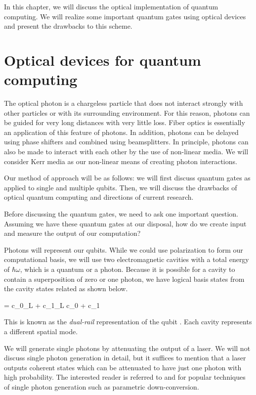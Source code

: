 In this chapter, we will discuss the optical implementation of quantum computing. We will realize some important quantum gates using optical devices and present the drawbacks to this scheme.
\section{Optical devices for quantum computing}
The optical photon is a chargeless particle that does not interact strongly with other particles or with its surrounding environment. For this reason, photons can be guided for very long distances with very little loss. Fiber optics is essentially an application of this feature of photons. In addition, photons can be delayed using phase shifters and combined using beamsplitters. In principle, photons can also be made to interact with each other by the use of non-linear media. We will consider Kerr media as our non-linear means of creating photon interactions. 

Our method of approach will be as follows: we will first discuss quantum gates as applied to single and multiple qubits. Then, we will discuss the drawbacks of optical quantum computing and directions of current research.

Before discussing the quantum gates, we need to ask one important question. Assuming we have these quantum gates at our disposal, how do we create input and measure the output of our computation? 

Photons will represent our qubits. While we could use polarization to form our computational basis, we will use two electromagnetic cavities with a total energy of $\hbar\omega$, which is a quantum or a photon. Because it is possible for a cavity to contain a superposition of zero or one photon, we have logical basis states from the cavity states related as shown below.

\beq
\ketp = c_0_L + c_1_L \equiv c_0 + c_1
\eeq

This is known as the \textit{dual-rail} representation of the qubit \cite{nielsen2000}. Each cavity represents a different spatial mode.

We will generate single photons by attenuating the output of a laser. We will not discuss single photon generation in detail, but it suffices to mention that a laser outputs coherent states which can be attenuated to have just one photon with high probability. The interested reader is referred to \cite{foxqoptics} and \cite{milburnqoptics} for popular techniques of single photon generation such as parametric down-conversion. 

